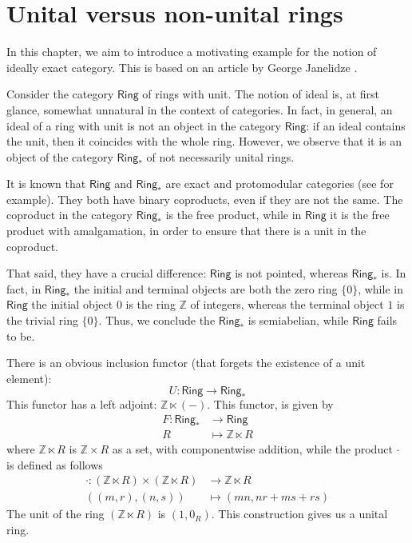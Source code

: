 \chapter{Unital versus non-unital rings}

\fontsize{12}{14.5}\selectfont

In this chapter, we aim to introduce a motivating example for the notion of ideally exact category. This is based on an article by George Janelidze \cite{Janelidze2024}.

Consider the category $\mathsf{Ring}$ of rings with unit. The notion of ideal is, at first glance, somewhat unnatural in the context of categories. In fact, in general, an ideal of a ring with unit is not an object in the category $\mathsf{Ring}$: if an ideal contains the unit, then it coincides with the whole ring. However, we observe that it is an object of the category $\mathsf{Ring_*}$ of not necessarily unital rings.

It is known that $\mathsf{Ring}$ and $\mathsf{Ring_*}$ are exact and protomodular categories (see \cite{BorceuxBourn2004} for example). They both have binary coproducts, even if they are not the same. The coproduct in the category $\mathsf{Ring_*}$ is the free product, while in $\mathsf{Ring}$ it is the free product with amalgamation, in order to ensure that there is a unit in the coproduct.

That said, they have a crucial difference: $\mathsf{Ring}$ is not pointed, whereas $\mathsf{Ring_*}$ is. In fact, in $\mathsf{Ring_*}$ the initial and terminal objects are both the zero ring $\{0\}$, while in $\mathsf{Ring}$ the initial object $0$ is the ring $\mathbb{Z}$ of integers, whereas the terminal object $1$ is the trivial ring $\{0\}$. Thus, we conclude the $\mathsf{Ring_*}$ is semiabelian, while $\mathsf{Ring}$ fails to be.

There is an obvious inclusion functor (that forgets the existence of a unit element):
\[U: \mathsf{Ring} \to \mathsf{Ring_*}\]
This functor has a left adjoint: $\mathbb{Z} \ltimes (-)$. This functor, is given by
\begin{align*}
F: \mathsf{Ring_*} &\to \mathsf{Ring} \\
R &\mapsto \mathbb{Z} \ltimes R
\end{align*}
where $\mathbb{Z} \ltimes R$ is $\mathbb{Z} \times R$ as a set, with componentwise addition, while the product $\cdot$ is defined as follows
\begin{align*}
\cdot : (\mathbb{Z} \ltimes R) \times (\mathbb{Z} \ltimes R) &\to \mathbb{Z} \ltimes R \\
((m,r),(n,s))&\mapsto (mn, nr + ms + rs)
\end{align*}
The unit of the ring $(\mathbb{Z} \ltimes R)$ is $(1,0_R)$. This construction gives us a unital ring.

